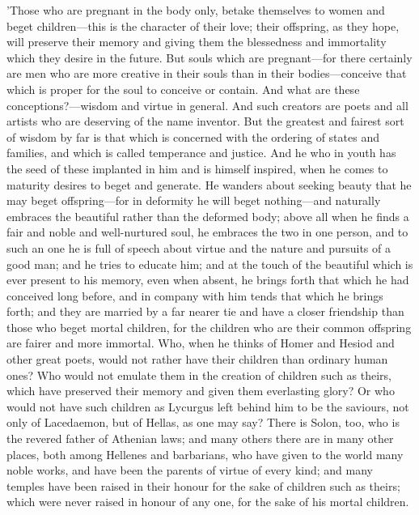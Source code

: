\documentclass[11pt,letter]{article}
\begin{document}
\par  'Those who are pregnant in the body only, betake themselves to women and beget children—this is the character of their love; their offspring, as they hope, will preserve their memory and giving them the blessedness and immortality which they desire in the future. But souls which are pregnant—for there certainly are men who are more creative in their souls than in their bodies—conceive that which is proper for the soul to conceive or contain. And what are these conceptions?—wisdom and virtue in general. And such creators are poets and all artists who are deserving of the name inventor. But the greatest and fairest sort of wisdom by far is that which is concerned with the ordering of states and families, and which is called temperance and justice. And he who in youth has the seed of these implanted in him and is himself inspired, when he comes to maturity desires to beget and generate. He wanders about seeking beauty that he may beget offspring—for in deformity he will beget nothing—and naturally embraces the beautiful rather than the deformed body; above all when he finds a fair and noble and well-nurtured soul, he embraces the two in one person, and to such an one he is full of speech about virtue and the nature and pursuits of a good man; and he tries to educate him; and at the touch of the beautiful which is ever present to his memory, even when absent, he brings forth that which he had conceived long before, and in company with him tends that which he brings forth; and they are married by a far nearer tie and have a closer friendship than those who beget mortal children, for the children who are their common offspring are fairer and more immortal. Who, when he thinks of Homer and Hesiod and other great poets, would not rather have their children than ordinary human ones? Who would not emulate them in the creation of children such as theirs, which have preserved their memory and given them everlasting glory? Or who would not have such children as Lycurgus left behind him to be the saviours, not only of Lacedaemon, but of Hellas, as one may say? There is Solon, too, who is the revered father of Athenian laws; and many others there are in many other places, both among Hellenes and barbarians, who have given to the world many noble works, and have been the parents of virtue of every kind; and many temples have been raised in their honour for the sake of children such as theirs; which were never raised in honour of any one, for the sake of his mortal children.
\end{document}

